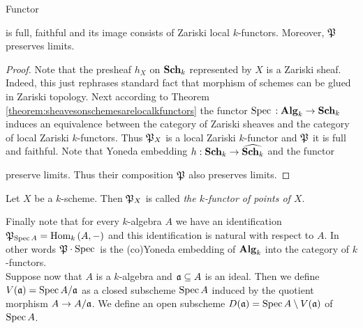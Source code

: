 \begin{fact}\label{fact:functorsofpoints}
Functor
\begin{center}
\end{center}
is full, faithful and its image consists of Zariski local $k$-functors. Moreover, ${\mathfrak P}$ preserves limits.
\end{fact}
\begin{proof}
Note that the presheaf $h_X$ on $\mathbf{Sch}_k$ represented by $X$ is a Zariski sheaf. Indeed, this just rephrases standard fact that morphism of schemes can be glued in Zariski topology. Next according to Theorem \ref{theorem:sheavesonschemesarelocalkfunctors} the functor $\mathrm{Spec}\,:\mathbf{Alg}_k\rightarrow \mathbf{Sch}_k$ induces an equivalence between the category of Zariski sheaves and the category of local Zariski $k$-functors. Thus ${\mathfrak P}_X$ is a local Zariski $k$-functor and ${\mathfrak P}$ it is full and faithful. Note that Yoneda embedding $h:\mathbf{Sch}_k\rightarrow \widehat{\mathbf{Sch}_k}$ and the functor
\begin{center}
\end{center}
preserve limits. Thus their composition ${\mathfrak P}$ also preserves limits.
\end{proof}

\begin{definition}
Let $X$ be a $k$-scheme. Then ${\mathfrak P}_X$ is called \textit{the $k$-functor of points of $X$}.
\end{definition}
\noindent
Finally note that for every $k$-algebra $A$ we have an identification ${\mathfrak P}_{\mathrm{Spec}\, A} = \mathrm{Hom}_k\left(A,-\right)$ and this identification is natural with respect to $A$. In other words ${\mathfrak P}\cdot \mathrm{Spec}\,$ is the (co)Yoneda embedding of $\mathbf{Alg}_k$ into the category of $k$-functors.\\
Suppose now that $A$ is a $k$-algebra and $\mathfrak{a}\subseteq A$ is an ideal. Then we define $V(\mathfrak{a}) = \mathrm{Spec}\, A/\mathfrak{a}$ as a closed subscheme $\mathrm{Spec}\, A$ induced by the quotient morphism $A\rightarrow A/\mathfrak{a}$. We define an open subscheme $D(\mathfrak{a}) = \mathrm{Spec}\, A\setminus V(\mathfrak{a})$ of $\mathrm{Spec}\, A$.

